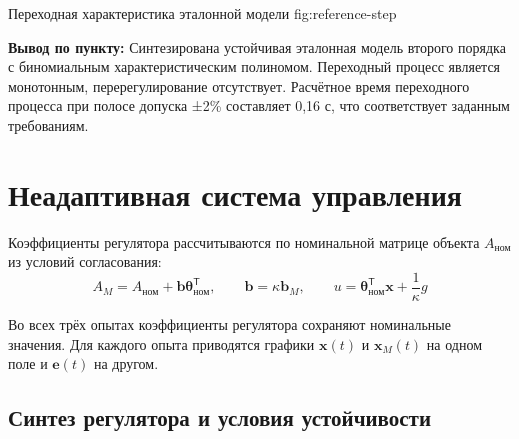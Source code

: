   {Переходная характеристика эталонной модели}
  {fig:reference-step}

\noindent\textbf{Вывод по пункту:} Синтезирована устойчивая эталонная модель второго порядка с биномиальным характеристическим полиномом. Переходный процесс является монотонным, перерегулирование отсутствует. Расчётное время переходного процесса при полосе допуска ±2\% составляет 0,16 с, что соответствует заданным требованиям.

\section{Неадаптивная система управления}

Коэффициенты регулятора рассчитываются по номинальной матрице объекта
$A_{\text{ном}}$ из условий согласования:
\begin{equation}
  A_M=A_{\text{ном}}+\bm b\bm\theta_{\text{ном}}^{\mathsf T},
  \qquad \bm b=\kappa\bm b_M,
  \qquad u=\bm\theta_{\text{ном}}^{\mathsf T}\bm x+\frac{1}{\kappa}g
\end{equation}

Во всех трёх опытах коэффициенты регулятора сохраняют номинальные значения.
Для каждого опыта приводятся графики $\bm x(t)$ и $\bm x_M(t)$
на одном поле и $\bm e(t)$ на другом.

\subsection{Синтез регулятора и условия устойчивости}

